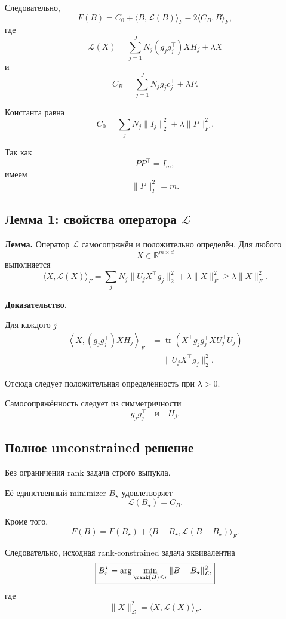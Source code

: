 Следовательно,
\[
\boxed{
    F(B)
    =
    C_0
    +
    \langle B,\mathcal L(B)\rangle_F
    -
    2\langle C_B,B\rangle_F,
}
\]
где
\[
\boxed{
    \mathcal L(X)
    =
    \sum_{j=1}^J
    N_j
    (g_jg_j^\top)
    XH_j
    +
    \lambda X
}
\]
и
\[
\boxed{
    C_B
    =
    \sum_{j=1}^J
    N_jg_jc_j^\top
    +
    \lambda P.
}
\]

Константа равна
\[
    C_0
    =
    \sum_jN_j\|I_j\|_2^2
    +
    \lambda\|P\|_F^2.
\]

Так как
\[
    PP^\top=I_m,
\]
имеем
\[
    \|P\|_F^2=m.
\]

\subsection{Лемма 1: свойства оператора $\mathcal L$}

\textbf{Лемма.}
Оператор $\mathcal L$ самосопряжён и положительно определён.
Для любого
\[
    X\in\mathbb R^{m\times d}
\]
выполняется
\[
\boxed{
    \langle X,\mathcal L(X)\rangle_F
    =
    \sum_j
    N_j
    \|U_jX^\top g_j\|_2^2
    +
    \lambda\|X\|_F^2
    \ge
    \lambda\|X\|_F^2.
}
\]

\textbf{Доказательство.}

Для каждого $j$
\[
\begin{aligned}
    \left\langle
        X,
        (g_jg_j^\top)XH_j
    \right\rangle_F
    &=
    \operatorname{tr}
    \left(
        X^\top g_jg_j^\top XU_j^\top U_j
    \right)
    \\
    &=
    \|U_jX^\top g_j\|_2^2.
\end{aligned}
\]

Отсюда следует положительная определённость при $\lambda>0$.

Самосопряжённость следует из симметричности
\[
    g_jg_j^\top
    \quad\text{и}\quad
    H_j.
\]

\subsection{Полное unconstrained решение}

Без ограничения rank задача строго выпукла.

Её единственный minimizer $B_\star$ удовлетворяет
\[
\boxed{
    \mathcal L(B_\star)=C_B.
}
\]

Кроме того,
\[
\boxed{
    F(B)
    =
    F(B_\star)
    +
    \langle
        B-B_\star,
        \mathcal L(B-B_\star)
    \rangle_F.
}
\]

Следовательно, исходная rank-constrained задача эквивалентна
\[
\boxed{
    B_r^\star
    =
    \arg\min_{\rank(B)\le r}
    \|B-B_\star\|_{\mathcal L}^2,
}
\]
где
\[
    \|X\|_{\mathcal L}^2
    =
    \langle X,\mathcal L(X)\rangle_F.
\]

